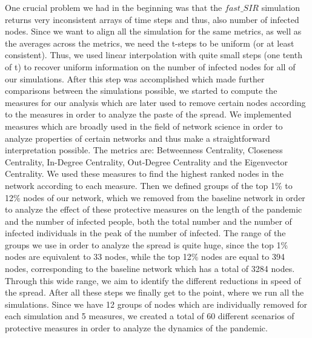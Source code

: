 \documentclass{Template resources/netsci-project}
\begin{document}
One crucial problem we had in the beginning was that the $fast\_SIR$ simulation returns very inconsistent arrays of time steps and thus, also number of infected nodes. Since we want to align all the simulation for the same metrics, as well as the averages across the metrics, we need the t-steps to be uniform (or at least consistent). Thus, we used linear interpolation with quite small steps (one tenth of t) to recover uniform information on the number of infected nodes for all of our simulations. After this step was accomplished which made further comparisons between the simulations possible, we started to compute the measures for our analysis which are later used to  remove certain nodes according to the measures in order to analyze the paste of the spread. We implemented measures which are broadly used in the field of network science in order to analyze properties of certain networks and thus make a straightforward interpretation possible. The metrics are: Betweenness Centrality, Closeness Centrality, In-Degree Centrality, Out-Degree Centrality and the Eigenvector Centrality. We used these measures to find the highest ranked nodes in the network according to each measure. Then we defined groups of the top 1\% to 12\% nodes of our network, which we removed from the baseline network in order to analyze the effect of these protective measures on the length of the pandemic and the number of infected people, both the total number and the number of infected individuals in the peak of the number of infected. The range of the groups we use in order to analyze the spread is quite huge, since the top 1\% nodes are equivalent to 33 nodes, while the top 12\% nodes are equal to 394 nodes, corresponding to the baseline network which has a total of 3284 nodes. Through this wide range, we aim to identify the different reductions in speed of the spread. After all these steps we finally get to the point, where we run all the simulations. Since we have 12 groups of nodes which are individually removed for each simulation and 5 measures, we created a total of 60 different scenarios of protective measures in order to analyze the dynamics of the pandemic. 
\end{document}
